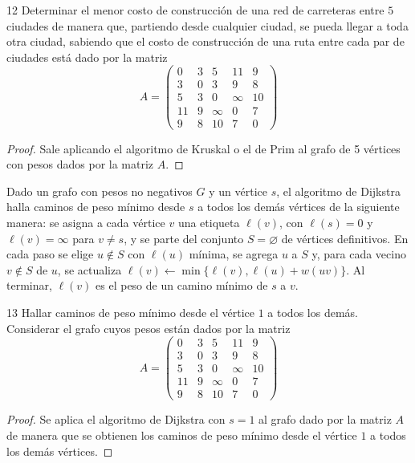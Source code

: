 \begin{ejercicio}{12}
    Determinar el menor costo de construcción de una red de carreteras entre \( 5 \) ciudades de manera que, partiendo desde cualquier ciudad, se pueda llegar a toda otra ciudad, sabiendo que el costo de construcción de una ruta entre cada par de ciudades está dado por la matriz
    \[
        A = \begin{pmatrix}
            0  & 3 & 5      & 11     & 9  \\
            3  & 0 & 3      & 9      & 8  \\
            5  & 3 & 0      & \infty & 10 \\
            11 & 9 & \infty & 0      & 7  \\
            9  & 8 & 10     & 7      & 0
        \end{pmatrix}
    \]
\end{ejercicio}
\begin{proof}
    Sale aplicando el algoritmo de Kruskal o el de Prim al grafo de 5 vértices con pesos dados por la matriz \( A \).
\end{proof}

\vspace{0.5cm}

\begin{definition}
    Dado un grafo con pesos no negativos \( G \) y un vértice \( s \), el algoritmo de Dijkstra halla caminos de peso mínimo desde \( s \) a todos los demás vértices de la siguiente manera: se asigna a cada vértice \( v \) una etiqueta \( \ell(v) \), con \( \ell(s) = 0 \) y \( \ell(v) = \infty \) para \( v \neq s \), y se parte del conjunto \( S = \varnothing \) de vértices definitivos. En cada paso se elige \( u \notin S \) con \( \ell(u) \) mínima, se agrega \( u \) a \( S \) y, para cada vecino \( v \notin S \) de \( u \), se actualiza \( \ell(v) \leftarrow \min\{ \ell(v), \ell(u) + w(uv) \} \). Al terminar, \( \ell(v) \) es el peso de un camino mínimo de \( s \) a \( v \).
\end{definition}

\begin{ejercicio}{13}
    Hallar caminos de peso mínimo desde el vértice \( 1 \) a todos los demás. Considerar el grafo cuyos pesos están dados por la matriz
    \[
        A = \begin{pmatrix}
            0  & 3 & 5      & 11     & 9  \\
            3  & 0 & 3      & 9      & 8  \\
            5  & 3 & 0      & \infty & 10 \\
            11 & 9 & \infty & 0      & 7  \\
            9  & 8 & 10     & 7      & 0
        \end{pmatrix}
    \]
\end{ejercicio}
\begin{proof}
    Se aplica el algoritmo de Dijkstra con \( s = 1 \) al grafo dado por la matriz \( A \) de manera que se obtienen los caminos de peso mínimo desde el vértice \( 1 \) a todos los demás vértices.
\end{proof}

